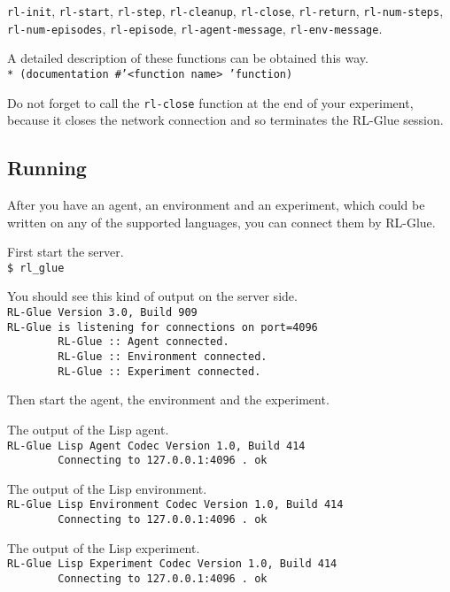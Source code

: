 \documentclass[11pt,a4paper,dvipdfm]{article}
\newcommand{\prompttext}[1]{\texttt{#1}}
\newcommand{\shprompt}[1]{\prompttext{\$ #1}}
\newcommand{\lispprompt}[1]{\prompttext{* #1}}
\begin{document}
\prompttext{rl-init},
\prompttext{rl-start},
\prompttext{rl-step},
\prompttext{rl-cleanup},
\prompttext{rl-close},
\prompttext{rl-return},
\prompttext{rl-num-steps}, \\
\prompttext{rl-num-episodes},
\prompttext{rl-episode},
\prompttext{rl-agent-message},
\prompttext{rl-env-message}.

A detailed description of these functions can be obtained this way. \\
\lispprompt{(documentation \#'<function name> 'function)}

Do not forget to call the \prompttext{rl-close} function at the end of your
experiment, because it closes the network connection and so terminates the
RL-Glue session.

\subsection{Running}

After you have an agent, an environment and an experiment, which could be
written on any of the supported languages, you can connect them by RL-Glue.

First start the server. \\
\shprompt{rl\_glue}

You should see this kind of output on the server side. \\
\prompttext{RL-Glue Version 3.0, Build 909 \\
RL-Glue is listening for connections on port=4096 \\
\mbox{~~~~~~~~}RL-Glue ::~Agent connected. \\
\mbox{~~~~~~~~}RL-Glue ::~Environment connected. \\
\mbox{~~~~~~~~}RL-Glue ::~Experiment connected.}

Then start the agent, the environment and the experiment.

The output of the Lisp agent. \\
\prompttext{RL-Glue Lisp Agent Codec Version 1.0, Build 414 \\
\mbox{~~~~~~~~}Connecting to 127.0.0.1:4096 .~ok}

The output of the Lisp environment. \\
\prompttext{RL-Glue Lisp Environment Codec Version 1.0, Build 414 \\
\mbox{~~~~~~~~}Connecting to 127.0.0.1:4096 .~ok}

The output of the Lisp experiment. \\
\prompttext{RL-Glue Lisp Experiment Codec Version 1.0, Build 414 \\
\mbox{~~~~~~~~}Connecting to 127.0.0.1:4096 .~ok}
\end{document}
